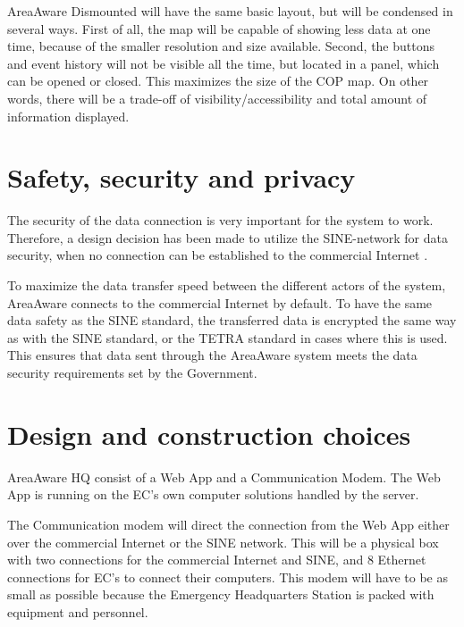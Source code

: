 AreaAware Dismounted will have the same basic layout, but will be condensed in several ways. First of all, the map will be capable of showing less data at one time, because of the smaller resolution and size available. Second, the buttons and event history will not be visible all the time, but located in a panel, which can be opened or closed. This maximizes the size of the COP map. On other words, there will be a trade-off of visibility/accessibility and total amount of information displayed.

\pagebreak

\section{Safety, security and privacy}
The security of the data connection is very important for the system to work. Therefore, a design decision has been made to utilize the SINE-network for data security, when no connection can be established to the commercial Internet \citep{SINE_artikel}. 

To maximize the data transfer speed between the different actors of the system, AreaAware connects to the commercial Internet by default. To have the same data safety as the SINE standard, the transferred data is encrypted the same way as with the SINE standard, or the TETRA standard in cases where this is used. This ensures that data sent through the AreaAware system meets the data security requirements set by the Government.

\section{Design and construction choices}
AreaAware HQ consist of a Web App and a Communication Modem. The Web App is running on the EC's own computer solutions handled by the server. 

The Communication modem will direct the connection from the Web App either over the commercial Internet or the SINE network. This will be a physical box with two connections for the commercial Internet and SINE, and 8 Ethernet connections for EC's to connect their computers. This modem will have to be as small as possible because the Emergency Headquarters Station is packed with equipment and personnel.\\

